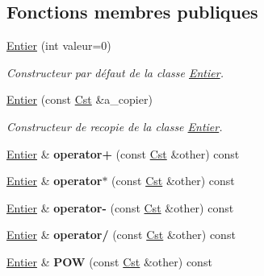 \subsection*{Fonctions membres publiques}
\begin{DoxyCompactItemize}
\item 
\hyperlink{classcalcul_1_1_entier_a9840d099d4b5b3f805699b5ba1a6eb3d}{Entier} (int valeur=0)
\begin{DoxyCompactList}\small\item\em Constructeur par défaut de la classe \hyperlink{classcalcul_1_1_entier}{Entier}. \end{DoxyCompactList}\item 
\hyperlink{classcalcul_1_1_entier_adfcff04f9903ae285a881621e6764903}{Entier} (const \hyperlink{classcalcul_1_1_cst}{Cst} \&a\-\_\-copier)
\begin{DoxyCompactList}\small\item\em Constructeur de recopie de la classe \hyperlink{classcalcul_1_1_entier}{Entier}. \end{DoxyCompactList}\item 
\hypertarget{classcalcul_1_1_entier_ac8a907eed01ccda92b6849e5f7895152}{\hyperlink{classcalcul_1_1_entier}{Entier} \& {\bfseries operator+} (const \hyperlink{classcalcul_1_1_cst}{Cst} \&other) const }\label{classcalcul_1_1_entier_ac8a907eed01ccda92b6849e5f7895152}

\item 
\hypertarget{classcalcul_1_1_entier_a78d5677a8ca7fd28eb54e4613b4c4c88}{\hyperlink{classcalcul_1_1_entier}{Entier} \& {\bfseries operator$\ast$} (const \hyperlink{classcalcul_1_1_cst}{Cst} \&other) const }\label{classcalcul_1_1_entier_a78d5677a8ca7fd28eb54e4613b4c4c88}

\item 
\hypertarget{classcalcul_1_1_entier_a7f19b05e1ba5df1d085aef46aa3fac10}{\hyperlink{classcalcul_1_1_entier}{Entier} \& {\bfseries operator-\/} (const \hyperlink{classcalcul_1_1_cst}{Cst} \&other) const }\label{classcalcul_1_1_entier_a7f19b05e1ba5df1d085aef46aa3fac10}

\item 
\hypertarget{classcalcul_1_1_entier_aae20e2ec9bf487e40c632bbcc76298f4}{\hyperlink{classcalcul_1_1_entier}{Entier} \& {\bfseries operator/} (const \hyperlink{classcalcul_1_1_cst}{Cst} \&other) const }\label{classcalcul_1_1_entier_aae20e2ec9bf487e40c632bbcc76298f4}

\item 
\hypertarget{classcalcul_1_1_entier_a07487e904c41b67b2516def34c2d7819}{\hyperlink{classcalcul_1_1_entier}{Entier} \& {\bfseries P\-O\-W} (const \hyperlink{classcalcul_1_1_cst}{Cst} \&other) const }\label{classcalcul_1_1_entier_a07487e904c41b67b2516def34c2d7819}


\end{DoxyCompactItemize}
